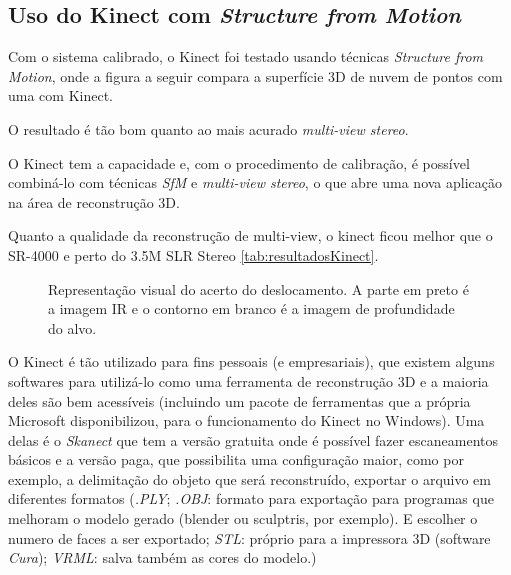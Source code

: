 \subsection*{Uso do Kinect com \emph{Structure from Motion}}

Com o sistema calibrado, o Kinect foi testado usando técnicas \emph{Structure from Motion}, onde a figura a seguir compara a superfície 3D de nuvem de pontos com uma com Kinect. 

O resultado é tão bom quanto ao mais acurado \emph{multi-view stereo}.

O Kinect tem a capacidade e, com o procedimento de calibração, é possível combiná-lo com técnicas \emph{SfM} e \emph{multi-view stereo}, o que abre uma nova aplicação na área de reconstrução 3D.

Quanto a qualidade da reconstrução de multi-view, o kinect ficou melhor que o SR-4000 e perto do 3.5M SLR Stereo \ref{tab:resultadosKinect}.

\begin{figure}[!h]
	\centering
	\caption{%
	Representação visual do acerto do deslocamento. A parte em preto é a imagem IR e o contorno em branco é a imagem de profundidade do alvo.
	}\label{fig:deslocKinect}
\end{figure}

O Kinect é tão utilizado para fins pessoais (e empresariais), que existem alguns softwares para utilizá-lo como uma ferramenta de reconstrução 3D e a maioria deles são bem acessíveis (incluindo um pacote de ferramentas que a própria Microsoft disponibilizou, para o funcionamento do Kinect no Windows). Uma delas é o \emph{Skanect} que tem a versão gratuita onde é possível fazer escaneamentos básicos e a versão paga, que possibilita uma configuração maior, como por exemplo, a delimitação do objeto que será reconstruído, exportar o arquivo em diferentes formatos (\emph{.PLY}; \emph{.OBJ}: formato para exportação para programas que melhoram o modelo gerado (blender ou sculptris, por exemplo). E escolher o numero de faces a ser exportado; \emph{STL}: próprio para a impressora 3D (software \emph{Cura}); \emph{VRML}: salva também as cores do modelo.)

